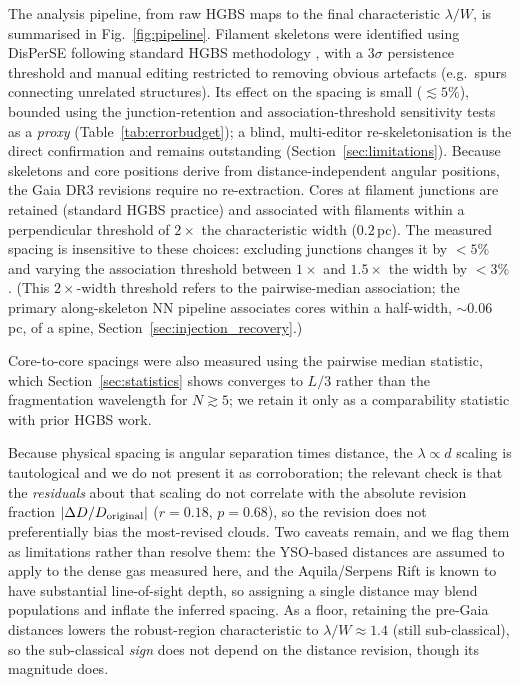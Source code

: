 \documentclass[usenatbib,twoside,twocolumn]{mnras}
\begin{document}
The analysis pipeline, from raw HGBS maps to the final characteristic $\lambda/W$, is summarised in Fig.~\ref{fig:pipeline}. Filament skeletons were identified using DisPerSE \citep{Sousbie2011} following standard HGBS methodology \citep{Arzoumanian2011}, with a $3\sigma$ persistence threshold and manual editing restricted to removing obvious artefacts (e.g.\ spurs connecting unrelated structures). Its effect on the spacing is small ($\lesssim5\%$), bounded using the junction-retention and association-threshold sensitivity tests as a \emph{proxy} (Table~\ref{tab:errorbudget}); a blind, multi-editor re-skeletonisation is the direct confirmation and remains outstanding (Section~\ref{sec:limitations}). Because skeletons and core positions derive from distance-independent angular positions, the Gaia DR3 revisions require no re-extraction. Cores at filament junctions are retained (standard HGBS practice) and associated with filaments within a perpendicular threshold of $2\times$ the characteristic width ($0.2$\,pc). The measured spacing is insensitive to these choices: excluding junctions changes it by $<5\%$ and varying the association threshold between $1\times$ and $1.5\times$ the width by $<3\%$. (This $2\times$-width threshold refers to the pairwise-median association; the primary along-skeleton NN pipeline associates cores within a half-width, $\sim0.06$\,pc, of a spine, Section~\ref{sec:injection_recovery}.)

Core-to-core spacings were also measured using the pairwise median statistic, which Section~\ref{sec:statistics} shows converges to $L/3$ rather than the fragmentation wavelength for $N\gtrsim5$; we retain it only as a comparability statistic with prior HGBS work.

Because physical spacing is angular separation times distance, the $\lambda\propto d$ scaling is tautological and we do not present it as corroboration; the relevant check is that the \emph{residuals} about that scaling do not correlate with the absolute revision fraction $|\Delta D/D_{\rm original}|$ ($r=0.18$, $p=0.68$), so the revision does not preferentially bias the most-revised clouds. Two caveats remain, and we flag them as limitations rather than resolve them: the YSO-based distances \citep{Zhang2023} are assumed to apply to the dense gas measured here, and the Aquila/Serpens Rift is known to have substantial line-of-sight depth, so assigning a single distance may blend populations and inflate the inferred spacing. As a floor, retaining the pre-Gaia distances lowers the robust-region characteristic to $\lambda/W\approx1.4$ (still sub-classical), so the sub-classical \emph{sign} does not depend on the distance revision, though its magnitude does.
\end{document}
